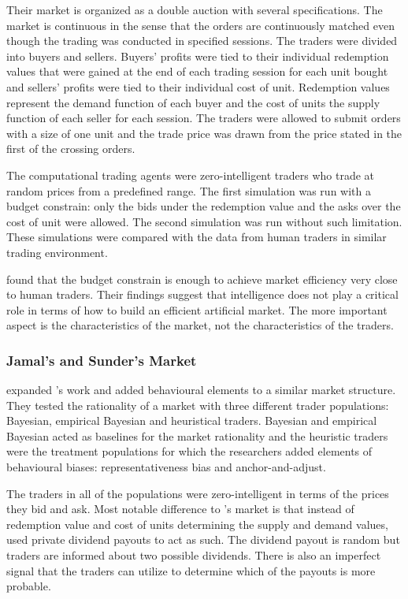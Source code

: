 Their market is organized as a double auction with several
specifications. The market is continuous in the sense that the 
orders are continuously matched even though the trading was
conducted in specified sessions. The traders were divided 
into buyers and sellers. Buyers' profits were tied to their 
individual redemption values that were gained at the end of
each trading session for each unit bought and sellers' profits
were tied to their individual cost of unit. Redemption values
represent the demand function of each buyer and the cost of units 
the supply function of each seller for each session. The
traders were allowed to submit orders with a size of one unit
and the trade price was drawn from the price stated in the 
first of the crossing orders.

The computational trading agents were zero-intelligent traders 
who trade at random prices from a predefined range. 
The first simulation was run with a budget constrain: only the bids
under the redemption value and the asks over the cost of unit 
were allowed. The second simulation was run without such limitation.
These simulations were compared with the data from human traders
in similar trading environment.

\citeauthor{God93} found that the budget constrain is enough to 
achieve market efficiency very close to human traders. Their findings
suggest that intelligence does not play a critical role in terms of 
how to build an efficient artificial market. The more important aspect
is the characteristics of the market, not the characteristics of the traders.

\subsubsection{Jamal's and Sunder's Market}
\citet{Jam96} expanded \citeauthor{God93}'s work and added behavioural 
elements to a similar market structure. They tested the rationality of
a market with three different trader populations: Bayesian, empirical
Bayesian and heuristical traders. Bayesian and empirical Bayesian acted
as baselines for the market rationality and the heuristic traders were
the treatment populations for which the researchers added elements of behavioural
biases: representativeness bias and anchor-and-adjust. 

The traders in all of the populations were zero-intelligent in terms of the
prices they bid and ask. Most notable difference to \citet{God93}'s market
is that instead of redemption value and cost of units determining the
supply and demand values, \citeauthor{Jam96} used private dividend payouts 
to act as such. The dividend payout is random but traders are informed
about two possible dividends. There is also an imperfect signal that the
traders can utilize to determine which of the payouts is more probable. 

